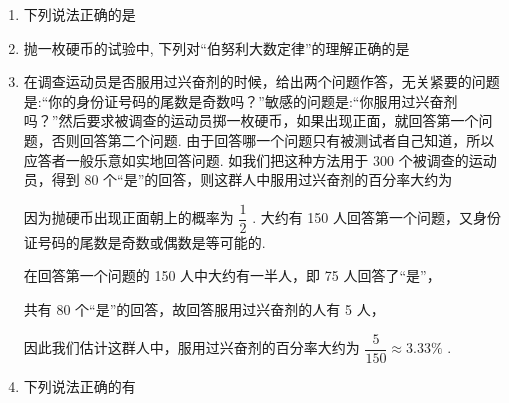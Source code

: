 \begin{enumerate}
\begin{enumerate}
        \item 下列说法正确的是
        
        \item 抛一枚硬币的试验中, 下列对“伯努利大数定律”的理解正确的是

        
        \item 在调查运动员是否服用过兴奋剂的时候，给出两个问题作答，无关紧要的问题是:“你的身份证号码的尾数是奇数吗？”敏感的问题是:“你服用过兴奋剂吗？”然后要求被调查的运动员掷一枚硬币，如果出现正面，就回答第一个问题，否则回答第二个问题. 由于回答哪一个问题只有被测试者自己知道，所以应答者一般乐意如实地回答问题. 如我们把这种方法用于 300 个被调查的运动员，得到 80 个“是”的回答，则这群人中服用过兴奋剂的百分率大约为
        \begin{jieda}
            因为抛硬币出现正面朝上的概率为 $\dfrac{1}{2}$ . 大约有 150 人回答第一个问题，又身份证号码的尾数是奇数或偶数是等可能的.

            在回答第一个问题的 150 人中大约有一半人，即 75 人回答了“是”，
            
            共有 80 个“是”的回答，故回答服用过兴奋剂的人有 5 人，
            
            因此我们估计这群人中，服用过兴奋剂的百分率大约为 $\dfrac{5}{150} \approx  {3.33}\%$ .
        \end{jieda}
        
        \item 下列说法正确的有


\end{enumerate}
\end{enumerate}
